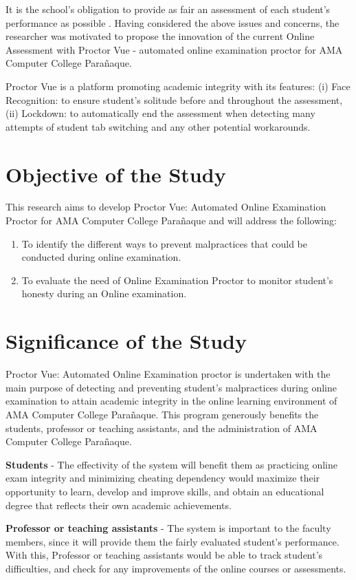 It is the school’s obligation to provide as fair an assessment of each student’s performance as possible \cite{lundahl2010skolbedomningens}.
Having considered the above issues and concerns, the researcher was motivated to propose the innovation of the current Online Assessment with Proctor Vue - automated online examination proctor for AMA Computer College Parañaque.

Proctor Vue is a platform promoting academic integrity with its features: (i) Face Recognition: to ensure student’s solitude before and throughout the assessment, (ii) Lockdown: to automatically end the assessment when detecting many attempts of student tab switching and any other potential workarounds.

\section{Objective of the Study}
This research aims to develop Proctor Vue: Automated Online Examination Proctor for AMA Computer College Parañaque and will address the following:
\begin{enumerate}
    \item To identify the different ways to prevent malpractices that could be conducted during online examination.
    \item To evaluate the need of Online Examination Proctor to monitor student's honesty during an Online examination.
\end{enumerate}

\section{Significance of the Study}

Proctor Vue: Automated Online Examination proctor is undertaken with the main purpose of detecting and preventing student’s malpractices during online examination to attain academic integrity in the online learning environment of AMA Computer College Parañaque. This program generously benefits the students, professor or teaching assistants, and the administration of AMA Computer College Parañaque.

\textbf{Students} - The effectivity of the system will benefit them as practicing online exam integrity and minimizing cheating dependency would maximize their opportunity to learn, develop and improve skills, and obtain an educational degree that reflects their own academic achievements.

\textbf{Professor or teaching assistants} - The system is important to the faculty members, since it will provide them the fairly evaluated student’s performance. With this, Professor or teaching assistants would be able to track student’s difficulties, and check for any improvements of the online courses or assessments.

